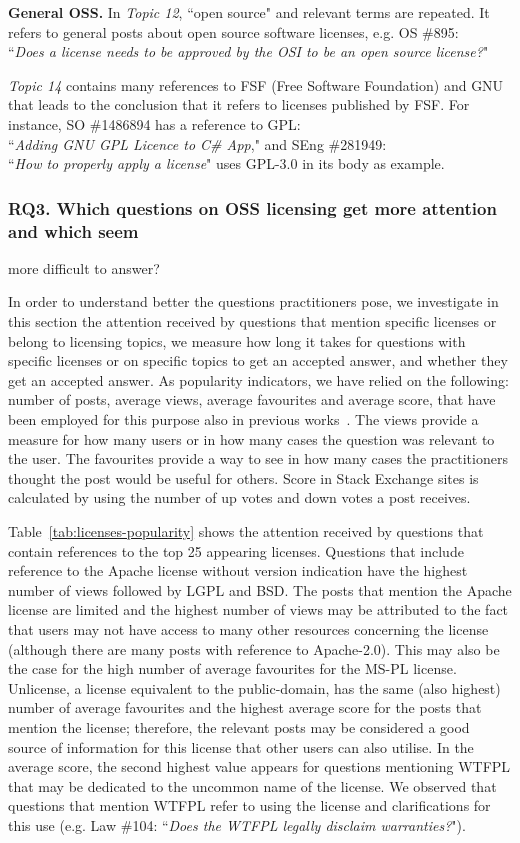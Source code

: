 \documentclass{elsarticle}
\begin{document}
\textbf{General OSS.} In \emph{Topic 12}, ``open source" and relevant terms are repeated. It refers to general posts about open source software licenses, e.g. OS \#895:\\
``\emph{Does a license needs to be approved by the OSI to be an open source license?}"

\emph{Topic 14} contains many references to FSF (Free Software Foundation) and GNU that leads to the conclusion that it refers to licenses published by FSF. For instance, SO \#1486894 has a reference to GPL:\\
``\emph{Adding GNU GPL Licence to C\# App}," and SEng \#281949:\\
``\emph{How to properly apply a license}" uses GPL-3.0 in its body as example.

\subsubsection{RQ3. Which questions on OSS licensing get more attention and which seem} more difficult to answer?

In order to understand better the questions practitioners pose, we investigate in this section the attention received by questions that mention specific licenses or belong to licensing topics, we measure how long it takes for questions with specific licenses or on specific topics to get an accepted answer, and whether they get an accepted answer. As popularity indicators, we have relied on the following: number of posts, average views, average favourites and average score, that have been employed for this purpose also in previous works~\cite{bajaj2014mining,abdellatif2020challenges}. The views provide a measure for how many users or in how many cases the question was relevant to the user. The favourites provide a way to see in how many cases the practitioners thought the post would be useful for others. Score in Stack Exchange sites is calculated by using the number of up votes and down votes a post receives. 

Table~\ref{tab:licenses-popularity} shows the attention received by questions that contain references to the top 25 appearing licenses. Questions that include reference to the Apache license without version indication have the highest number of views followed by LGPL and BSD. The posts that mention the Apache license are limited and the highest number of views may be attributed to the fact that users may not have access to many other resources concerning the license (although there are many posts with reference to Apache-2.0). This may also be the case for the high number of average favourites for the MS-PL license. Unlicense, a license equivalent to the public-domain, has the same (also highest) number of average favourites and the highest average score for the posts that mention the license; therefore, the relevant posts may be considered a good source of information for this license that other users can also utilise. In the average score, the second highest value appears for questions mentioning WTFPL that may be dedicated to the uncommon name of the license. We observed that questions that mention WTFPL refer to using the license and clarifications for this use (e.g. Law \#104: ``\emph{Does the WTFPL legally disclaim warranties?}"). 
\end{document}
